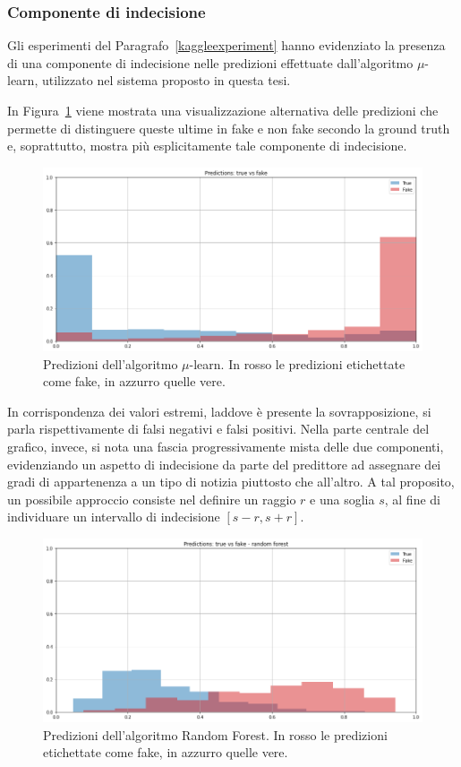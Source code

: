 \documentclass[12pt]{report}
\theoremstyle{definition}
\begin{document}
\subsubsection{Componente di indecisione}
Gli esperimenti del Paragrafo~\ref{kaggleexperiment} hanno evidenziato la presenza di una componente di indecisione nelle predizioni effettuate dall'algoritmo $\mu$-learn, utilizzato nel sistema proposto in questa tesi. 

In Figura~\ref{overlaypred} viene mostrata una visualizzazione alternativa delle predizioni che permette di distinguere queste ultime in fake e non fake secondo la ground truth e, soprattutto, mostra più esplicitamente tale componente di indecisione.
\begin{figure}
    \centering
    \includegraphics[scale=0.48]{images/experiment_kaggle/overlaypred.png}
    \caption{Predizioni dell'algoritmo $\mu$-learn. In rosso le predizioni etichettate come fake, in azzurro quelle vere.}
    \label{overlaypred}
\end{figure}
In corrispondenza dei valori estremi, laddove è presente la sovrapposizione, si parla rispettivamente di falsi negativi e falsi positivi. Nella parte centrale del grafico, invece, si nota una fascia progressivamente mista delle due componenti, evidenziando un aspetto di indecisione da parte del predittore ad assegnare dei gradi di appartenenza a un tipo di notizia piuttosto che all'altro.
A tal proposito, un possibile approccio consiste nel definire un raggio $r$ e una soglia $s$, al fine di individuare un intervallo di indecisione $[s-r,s+r]$.
\begin{figure}
    \centering
    \includegraphics[scale=0.48]{images/experiment_kaggle/indecisionrf.png}
    \caption{Predizioni dell'algoritmo Random Forest. In rosso le predizioni etichettate come fake, in azzurro quelle vere.}
    \label{indecisionrf}
\end{figure}
\end{document}
